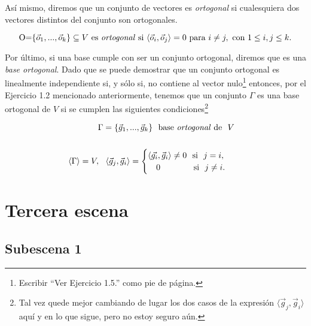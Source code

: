 \documentclass[12pt,dvipsnames]{article}
\numberwithin{equation}{section}
\begin{document}
\noindent Así mismo, diremos que un conjunto de vectores es \emph{ortogonal} si cualesquiera dos vectores distintos del conjunto son ortogonales.

\[
    \text{O=}\{\vec{o}_1,...,\vec{o}_k\}\subseteq V \ \text{es \emph{ortogonal} si} \ \langle \vec{o}_i , \vec{o}_j \rangle = 0 \ \text{para} \ i\neq j, \ \text{con} \ 1\le i,j\le k.
\]

\noindent Por último, si una base cumple con ser un conjunto ortogonal, diremos que es una \emph{base ortogonal}. Dado que se puede demostrar que un conjunto ortogonal es linealmente independiente si, y sólo si, no contiene al vector nulo\footnote{Escribir ``Ver Ejercicio 1.5.'' como pie de página.} entonces, por el Ejercicio 1.2 mencionado anteriormente, tenemos que un conjunto $\Gamma$ es una base ortogonal de $V$ si se cumplen las siguientes condiciones\footnote{Tal vez quede mejor cambiando de lugar los dos casos de la expresión $\langle \vec{g}_j , \vec{g}_i \rangle$ aquí y en lo que sigue, pero no estoy seguro aún.}

\begin{align*}
    \Gamma=\{\vec{g}_1,...,\vec{g}_k\} \ \ \text{base \emph{ortogonal} de} \ \ V& & &\\
    \\
    \langle\Gamma\rangle = V, \ \ \langle \vec{g}_j , \vec{g}_i \rangle = \begin{cases} \langle\vec{g_i}, \vec{g}_i\rangle\neq0 \ \ \text{si} \ \ j = i, \\ \quad 0 \quad \ \ \ \ \ \ \ \ \ \text{si} \ \ j\neq i. \end{cases}& & &\\
\end{align*}


\newpage
\section{Tercera escena}

\subsection*{Subescena 1} \label{Ssec: Subescena 1}

\end{document}

